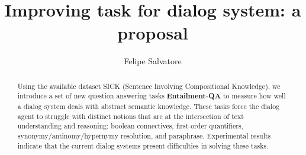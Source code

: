 \documentclass[12pt]{report}
\title{Improving task for dialog system: a proposal}
\author{Felipe Salvatore}
\begin{document}
\maketitle

\begin{abstract}
Using the available dataset SICK (Sentence Involving Compositional Knowledge), we introduce a set of new question answering tasks \textbf{Entailment-QA} to measure how well a dialog system deals with abstract semantic knowledge. These tasks force the dialog agent to struggle with distinct notions that are at the intersection of text understanding and reasoning: boolean connectives, first-order quantifiers, synonymy/antinomy/hypernymy resolution, and paraphrase. Experimental results indicate that the current dialog systems present difficulties in solving these tasks.
\end{abstract}
\tableofcontents








\end{document}
